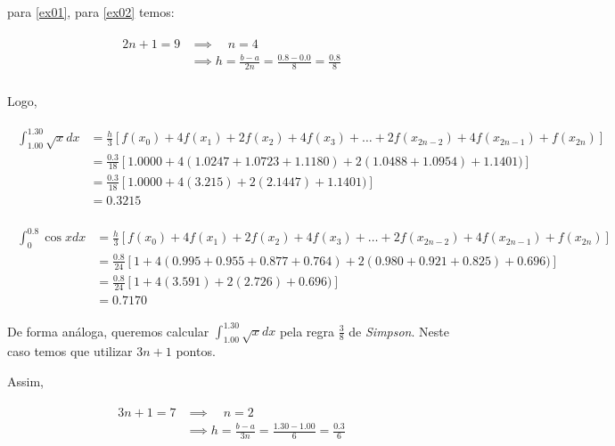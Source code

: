 \documentclass[paper=a4, fontsize=12pt]{scrartcl}
\numberwithin{equation}{section} %
\numberwithin{figure}{section} %
\numberwithin{table}{section} %
\begin{document}
		para \ref{ex01}, para \ref{ex02} temos:

		\begin{align*}
			\begin{split}
				2n + 1 = 9 	&\implies \quad n = 4 \\
				&\implies h = \frac{b - a}{2n} = \frac{0.8 - 0.0}{8} = \frac{0.8}{8}\\
			\end{split}
		\end{align*}

		Logo,

		\begin{align*}
			\begin{split}
				\int_{1.00}^{1.30} \sqrt{x} dx
				&= \frac{h}{3}\left[ f(x_0) + 4f(x_1) + 2f(x_2) + 4f(x_3) + \ldots + 2f(x_{2n-2}) + 4f(x_{2n-1}) + f(x_{2n}) \right] \\
				&= \frac{0.3}{18}\left[ 1.0000 + 4(1.0247 + 1.0723 + 1.1180) + 2(1.0488 + 1.0954) + 1.1401) \right] \\
				&= \frac{0.3}{18}\left[ 1.0000 + 4(3.215) + 2(2.1447) + 1.1401) \right] \\
				&= 0.3215
			\end{split}
		\end{align*}

		\begin{align*}
			\begin{split}
				\int_{0}^{0.8} \cos{x} dx
				&= \frac{h}{3}\left[ f(x_0) + 4f(x_1) + 2f(x_2) + 4f(x_3) + \ldots + 2f(x_{2n-2}) + 4f(x_{2n-1}) + f(x_{2n}) \right] \\
				&= \frac{0.8}{24}\left[ 1 + 4(0.995 + 0.955 + 0.877 + 0.764) + 2(0.980 + 0.921 + 0.825) + 0.696) \right] \\
				&= \frac{0.8}{24}\left[ 1 + 4(3.591) + 2(2.726) + 0.696) \right] \\
				&= 0.7170
			\end{split}
		\end{align*}

		De forma análoga, queremos calcular $ \int_{1.00}^{1.30} \sqrt{x} dx $ pela regra $\frac{3}{8}$ de \textit{Simpson}. Neste caso temos que utilizar $3n + 1$ pontos.

		Assim,

		\begin{align*}
			\begin{split}
				3n + 1 = 7 	&\implies \quad n = 2 \\
				&\implies h = \frac{b - a}{3n} = \frac{1.30 - 1.00}{6} = \frac{0.3}{6}\\
			\end{split}
		\end{align*}
\end{document}
